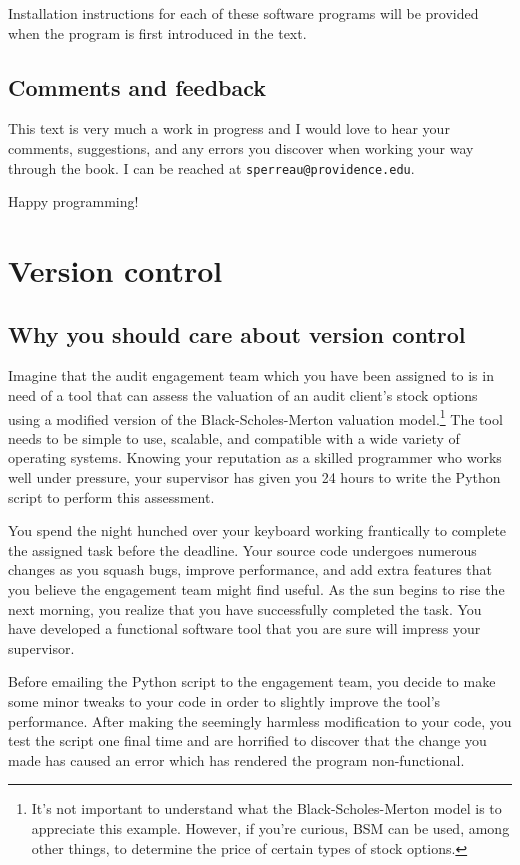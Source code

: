 \documentclass{book}
\begin{document}
Installation instructions for each of these software programs will be provided when the program is first introduced in the text.

\section{Comments and feedback}

This text is very much a work in progress and I would love to hear your comments, suggestions, and any errors you discover when working your way through the book. I can be reached at \texttt{sperreau@providence.edu}.

Happy programming!


\chapter{Version control}
\section{Why you should care about version control}

Imagine that the audit engagement team which you have been assigned to is in need of a tool that can assess the valuation of an audit client's stock options using a modified version of the Black-Scholes-Merton valuation model.\footnote{It's not important to understand what the Black-Scholes-Merton model is to appreciate this example. However, if you're curious, BSM can be used, among other things, to determine the price of certain types of stock options.} The tool needs to be simple to use, scalable, and compatible with a wide variety of operating systems. Knowing your reputation as a skilled programmer who works well under pressure, your supervisor has given you 24 hours to write the Python script to perform this assessment.

You spend the night hunched over your keyboard working frantically to complete the assigned task before the deadline. Your source code undergoes numerous changes as you squash bugs, improve performance, and add extra features that you believe the engagement team might find useful. As the sun begins to rise the next morning, you realize that you have successfully completed the task. You have developed a functional software tool that you are sure will impress your supervisor. 

Before emailing the Python script to the engagement team, you decide to make some minor tweaks to your code in order to slightly improve the tool's performance. After making the seemingly harmless modification to your code, you test the script one final time and are horrified to discover that the change you made has caused an error which has rendered the program non-functional.
\end{document}
